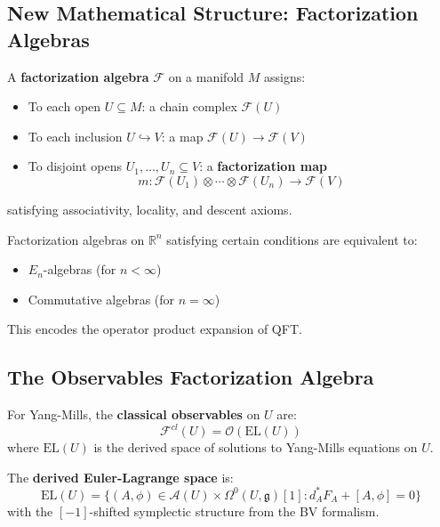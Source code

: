 \subsection{New Mathematical Structure: Factorization Algebras}

\begin{definition}
A \textbf{factorization algebra} $\mathcal{F}$ on a manifold $M$ assigns:
\begin{itemize}
    \item To each open $U \subseteq M$: a chain complex $\mathcal{F}(U)$
    \item To each inclusion $U \hookrightarrow V$: a map $\mathcal{F}(U) \to \mathcal{F}(V)$
    \item To disjoint opens $U_1, \ldots, U_n \subseteq V$: a \textbf{factorization map}
    \[
    m: \mathcal{F}(U_1) \otimes \cdots \otimes \mathcal{F}(U_n) \to \mathcal{F}(V)
    \]
\end{itemize}
satisfying associativity, locality, and descent axioms.
\end{definition}

\begin{theorem}
Factorization algebras on $\mathbb{R}^n$ satisfying certain conditions are equivalent to:
\begin{itemize}
    \item $E_n$-algebras (for $n < \infty$)
    \item Commutative algebras (for $n = \infty$)
\end{itemize}
This encodes the operator product expansion of QFT.
\end{theorem}

\subsection{The Observables Factorization Algebra}

\begin{definition}
For Yang-Mills, the \textbf{classical observables} on $U$ are:
\[
\mathcal{F}^{cl}(U) = \mathcal{O}(\text{EL}(U))
\]
where $\text{EL}(U)$ is the derived space of solutions to Yang-Mills equations on $U$.
\end{definition}

\begin{definition}
The \textbf{derived Euler-Lagrange space} is:
\[
\text{EL}(U) = \{(A, \phi) \in \mathcal{A}(U) \times \Omega^0(U, \mathfrak{g})[1] : d_A^* F_A + [A, \phi] = 0\}
\]
with the $[-1]$-shifted symplectic structure from the BV formalism.
\end{definition}

